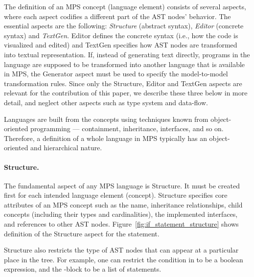 The definition of an MPS concept (language element) consists of several aspects, where each aspect codifies a different part of the AST nodes' behavior.
The essential aspects are the following: \emph{Structure} (abstract syntax), \emph{Editor} (concrete syntax) and \emph{TextGen}.
Editor defines the concrete syntax (i.e., how the code is visualized and edited) and TextGen specifies how AST nodes are transformed into textual representation.
If, instead of generating text directly, programs in the language are supposed to be transformed into another language that is available in MPS, the Generator aspect must be used to specify the model-to-model transformation rules.
Since only the Structure, Editor and TextGen aspects are relevant for the contribution of this paper, we describe these three below in more detail, and neglect other aspects such as type system and data-flow.

Languages are built from the concepts using techniques known from object-oriented programming --- containment, inheritance, interfaces, and so on.
Therefore, a definition of a whole language in MPS typically has an object-oriented and hierarchical nature.

\paragraph{Structure.}
The fundamental aspect of any MPS language is Structure.
It must be created first for each intended language element (concept).
Structure specifies core attributes of an MPS concept such as the name, inheritance relationships, child concepts (including their types and cardinalities), the implemented interfaces, and references to other AST nodes.
Figure~\ref{fig:if_statement_structure} shows definition of the Structure aspect for the  statement.

Structure also restricts the type of AST nodes that can appear at a particular place in the tree.
For example, one can restrict the condition in  to be a boolean expression, and the -block to be a list of statements.

